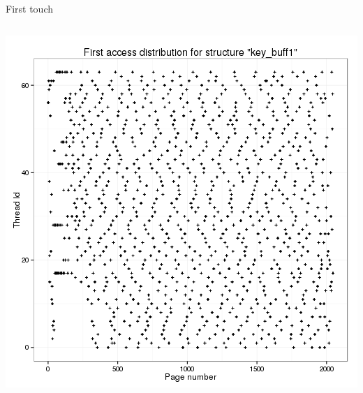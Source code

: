 \documentclass[xcolor={usenames,dvipsnames},hyperref={pdfusetitle}]{beamer}
\begin{document}
\begin{frame}{First touch}
{\begin{columns}
\begin{column}{.45\linewidth}
            \end{column}
        \end{columns}
    }{
        \centering
        \includegraphics[width=.65\linewidth]{tabarnac/is_b_kb1_ft.png}
    }
    \pause
\end{frame}
\end{document}
